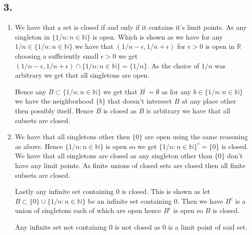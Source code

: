\documentclass{amsart}
\theoremstyle{plain}
\theoremstyle{definition}
\theoremstyle{remark}
\begin{document}
\subsection*{3.} 


\begin{enumerate}[label=(\alph*)]
    \item {
        


    We have that a set is closed if and only if it contains it's limit points. As any singleton in $\{1/n: n\in \mathbb{N}\}$ is open. Which is shown as we have for any $1/n\in \{1/n:n\in \mathbb{N}\}$ we have that $(1/n-\epsilon, 1/n+\epsilon)$ for $\epsilon >0$ is open in $\mathbb{R}$ choosing a sufficiently small $\epsilon>0$ we get $(1/n-\epsilon,1/n+\epsilon)\cap \{1/n:n\in \mathbb{N}\}=\{1/n\}$. As the choice of $1/n$ was arbitrary we get that all singletons are open.
    
    Hence any $B\subset \{1/n: n\in \mathbb N\}$ we get that $B^\prime=\emptyset$ as for any $b\in \{1/n:n\in \mathbb N\}$ we have the neighborhood $\{b\}$ that doesn't intersect $B$ at any place other then possibly itself. Hence $B$ is closed as $B$ is arbitrary we have that all subsets are closed. 
    }
    \item { 
    
    
    We have that all singletons other then $\{0\}$ are open using the same reasoning as above. Hence $\{1/n: n\in \mathbb{N}\}$ is open so we get $\{1/n: n\in \mathbb{N}\}^c=\{0\}$ is closed. We have that all singletons are closed as any singleton other than $\{0\}$ don't have any limit points. As finite unions of closed sets are closed then all finite subsets are closed. 
    
    Lastly any infinite set containing $0$ is closed. This is shown as let $B\subset \{0\}\cup \{1/n:n\in \mathbb{N}\}$ be an infinite set containing $0$. Then we have $B^c$ is a union of singletons each of which are open hence $B^c$ is open so $B$ is closed. 
    
    Any infinite set not containing $0$ is not closed as $0$ is a limit point of said set. 
    }
\end{enumerate}
\end{document}
